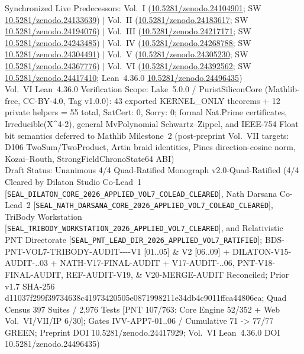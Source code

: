 \documentclass[11pt,a4paper,reqno]{article}
\def\texttt#1{#1}%
\theoremstyle{plain}
\theoremstyle{definition}
\theoremstyle{remark}
\numberwithin{equation}{section}
\numberwithin{table}{section}
\begin{document}
\begin{flushleft}
\texttt{Synchronized Live Predecessors: Vol.~I (\href{https://doi.org/10.5281/zenodo.24104901}{10.5281/zenodo.24104901}; SW \href{https://doi.org/10.5281/zenodo.24133639}{10.5281/zenodo.24133639}) $|$ Vol.~II (\href{https://doi.org/10.5281/zenodo.24183617}{10.5281/zenodo.24183617}; SW \href{https://doi.org/10.5281/zenodo.24194076}{10.5281/zenodo.24194076}) $|$ Vol.~III (\href{https://doi.org/10.5281/zenodo.24217171}{10.5281/zenodo.24217171}; SW \href{https://doi.org/10.5281/zenodo.24243485}{10.5281/zenodo.24243485}) $|$ Vol.~IV (\href{https://doi.org/10.5281/zenodo.24268788}{10.5281/zenodo.24268788}; SW \href{https://doi.org/10.5281/zenodo.24304491}{10.5281/zenodo.24304491}) $|$ Vol.~V (\href{https://doi.org/10.5281/zenodo.24305230}{10.5281/zenodo.24305230}; SW \href{https://doi.org/10.5281/zenodo.24367776}{10.5281/zenodo.24367776}) $|$ Vol.~VI (\href{https://doi.org/10.5281/zenodo.24392562}{10.5281/zenodo.24392562}; SW \href{https://doi.org/10.5281/zenodo.24417410}{10.5281/zenodo.24417410}; Lean~4.36.0 \href{https://doi.org/10.5281/zenodo.24496435}{10.5281/zenodo.24496435})}\\[0.4ex]
\texttt{Vol.~VI Lean~4.36.0 Verification Scope: Lake~5.0.0 / PuristSiliconCore (Mathlib-free, CC-BY-4.0, Tag v1.0.0): 43 exported KERNEL\_ONLY theorems + 12 private helpers = 55 total, SatCert: 0, Sorry: 0; formal Nat.Prime certificates, Irreducible(X\^{}4-2), general MvPolynomial Schwartz--Zippel, and IEEE-754 Float bit semantics deferred to Mathlib Milestone~2 (post-preprint Vol.~VII targets: D106 TwoSum/TwoProduct, Artin braid identities, Pines direction-cosine norm, Kozai--Routh, StrongFieldChronoState64 ABI)}\\[0.4ex]
\texttt{Draft Status: Unanimous 4/4 Quad-Ratified Monograph v2.0-Quad-Ratified (4/4 Cleared by Dilaton Studio Co-Lead~1 [\nolinkurl{SEAL_DILATON_CORE_2026_APPLIED_VOL7_COLEAD_CLEARED}], Nath Darsana Co-Lead~2 [\nolinkurl{SEAL_NATH_DARSANA_CORE_2026_APPLIED_VOL7_COLEAD_CLEARED}], TriBody Workstation [\nolinkurl{SEAL_TRIBODY_WORKSTATION_2026_APPLIED_VOL7_CLEARED}], and Relativistic PNT Directorate [\nolinkurl{SEAL_PNT_LEAD_DIR_2026_APPLIED_VOL7_RATIFIED}]; BDS-\allowbreak PNT-\allowbreak VOL7-\allowbreak TRIBODY-\allowbreak AUDIT-\allowbreak 2026-\allowbreak 11-\allowbreak 22-\allowbreak V1 [01..05] \& V2 [06..09] + DILATON-\allowbreak V15-\allowbreak AUDIT-\allowbreak 01..03 + NATH-\allowbreak V17-\allowbreak FINAL-\allowbreak AUDIT + V17-\allowbreak AUDIT-\allowbreak 01..06, PNT-\allowbreak V18-\allowbreak FINAL-\allowbreak AUDIT, REF-\allowbreak AUDIT-\allowbreak V19, \& V20-\allowbreak MERGE-\allowbreak AUDIT Reconciled; Prior v1.7 SHA-256 d11037f299f39734638c41973420505e0871998211e34db4c9011ffca44806ea; Quad Census 397 Suites / 2,976 Tests [PNT 107/763: Core Engine 52/352 + Web Vol.~VI/VII/IP 6/30]; Gates IVV-APP7-01..06 / Cumulative 71 -> 77/77 GREEN; Preprint DOI 10.5281/zenodo.24417929; Vol.~VI Lean~4.36.0 DOI 10.5281/zenodo.24496435)}\\[0.4ex]

\end{flushleft}
\end{document}
